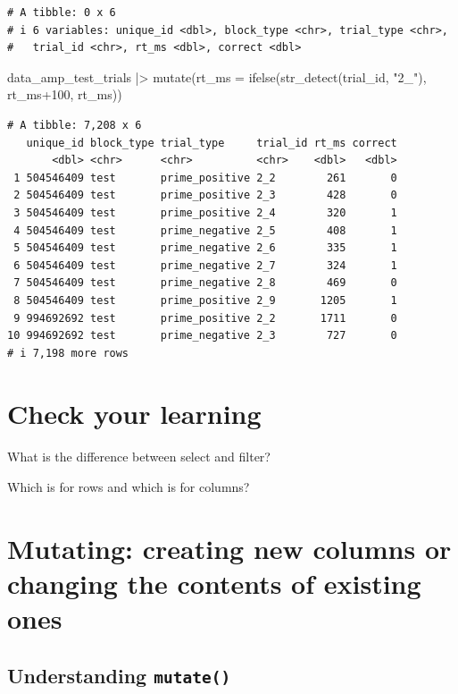 \documentclass[
  letterpaper,
  DIV=11,
  numbers=noendperiod]{scrreprt}
\newenvironment{Shaded}{\begin{snugshade}}{\end{snugshade}}
\newcommand{\AttributeTok}[1]{\textcolor[rgb]{0.40,0.45,0.13}{#1}}
\newcommand{\DecValTok}[1]{\textcolor[rgb]{0.68,0.00,0.00}{#1}}
\newcommand{\FunctionTok}[1]{\textcolor[rgb]{0.28,0.35,0.67}{#1}}
\newcommand{\NormalTok}[1]{\textcolor[rgb]{0.00,0.23,0.31}{#1}}
\newcommand{\SpecialCharTok}[1]{\textcolor[rgb]{0.37,0.37,0.37}{#1}}
\newcommand{\StringTok}[1]{\textcolor[rgb]{0.13,0.47,0.30}{#1}}
\begin{document}
\begin{verbatim}
# A tibble: 0 x 6
# i 6 variables: unique_id <dbl>, block_type <chr>, trial_type <chr>,
#   trial_id <chr>, rt_ms <dbl>, correct <dbl>
\end{verbatim}

\begin{Shaded}
\begin{Highlighting}[]
\NormalTok{data\_amp\_test\_trials }\SpecialCharTok{|\textgreater{}}
  \FunctionTok{mutate}\NormalTok{(}\AttributeTok{rt\_ms =} \FunctionTok{ifelse}\NormalTok{(}\FunctionTok{str\_detect}\NormalTok{(trial\_id, }\StringTok{"2\_"}\NormalTok{), rt\_ms}\SpecialCharTok{+}\DecValTok{100}\NormalTok{, rt\_ms))}
\end{Highlighting}
\end{Shaded}

\begin{verbatim}
# A tibble: 7,208 x 6
   unique_id block_type trial_type     trial_id rt_ms correct
       <dbl> <chr>      <chr>          <chr>    <dbl>   <dbl>
 1 504546409 test       prime_positive 2_2        261       0
 2 504546409 test       prime_positive 2_3        428       0
 3 504546409 test       prime_positive 2_4        320       1
 4 504546409 test       prime_negative 2_5        408       1
 5 504546409 test       prime_negative 2_6        335       1
 6 504546409 test       prime_negative 2_7        324       1
 7 504546409 test       prime_negative 2_8        469       0
 8 504546409 test       prime_positive 2_9       1205       1
 9 994692692 test       prime_positive 2_2       1711       0
10 994692692 test       prime_negative 2_3        727       0
# i 7,198 more rows
\end{verbatim}

\section{Check your learning}\label{check-your-learning}

What is the difference between select and filter?

Which is for rows and which is for columns?

\section{Mutating: creating new columns or changing the contents of
existing
ones}\label{mutating-creating-new-columns-or-changing-the-contents-of-existing-ones}

\subsection{\texorpdfstring{Understanding
\texttt{mutate()}}{Understanding mutate()}}\label{understanding-mutate}
\end{document}
